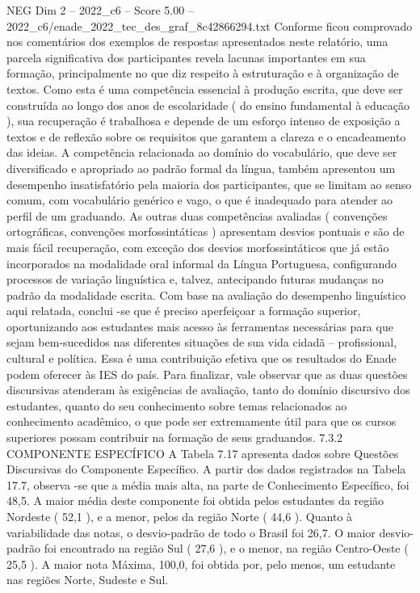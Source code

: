 \begin{textsample}{NEG Dim 2 – 2022\_c6 – Score 5.00 – 2022\_c6/enade\_2022\_tec\_des\_graf\_8c42866294.txt}
Conforme ficou comprovado nos comentários dos exemplos de respostas apresentados neste relatório, uma parcela significativa dos participantes revela lacunas importantes em sua formação, principalmente no que diz respeito à estruturação e à organização de textos.
Como esta é uma competência essencial à produção escrita, que deve ser construída ao longo dos anos de escolaridade ( do ensino fundamental à educação ), sua recuperação é trabalhosa e depende de um esforço intenso de exposição a textos e de reflexão sobre os requisitos que garantem a clareza e o encadeamento das ideias.
A competência relacionada ao domínio do vocabulário, que deve ser diversificado e apropriado ao padrão formal da língua, também apresentou um desempenho insatisfatório pela maioria dos participantes, que se limitam ao senso comum, com vocabulário genérico e vago, o que é inadequado para atender ao perfil de um graduando.
As outras duas competências avaliadas ( convenções ortográficas, convenções morfossintáticas ) apresentam desvios pontuais e são de mais fácil recuperação, com exceção dos desvios morfossintáticos que já estão incorporados na modalidade oral informal da Língua Portuguesa, configurando processos de variação linguística e, talvez, antecipando futuras mudanças no padrão da modalidade escrita.
Com base na avaliação do desempenho linguístico aqui relatada, conclui -se que é preciso aperfeiçoar a formação superior, oportunizando aos estudantes mais acesso às ferramentas necessárias para que sejam bem-sucedidos nas diferentes situações de sua vida cidadã – profissional, cultural e política.
Essa é uma contribuição efetiva que os resultados do Enade podem oferecer às IES do país.
Para finalizar, vale observar que as duas questões discursivas atenderam às exigências de avaliação, tanto do domínio discursivo dos estudantes, quanto do seu conhecimento sobre temas relacionados ao conhecimento acadêmico, o que pode ser extremamente útil para que os cursos superiores possam contribuir na formação de seus graduandos. 7.3.2 COMPONENTE ESPECÍFICO A Tabela 7.17 apresenta dados sobre Questões Discursivas do Componente Específico.
A partir dos dados registrados na Tabela 17.7, observa -se que a média mais alta, na parte de Conhecimento Específico, foi 48,5.
A maior média deste componente foi obtida pelos estudantes da região Nordeste ( 52,1 ), e a menor, pelos da região Norte ( 44,6 ).
Quanto à variabilidade das notas, o desvio-padrão de todo o Brasil foi 26,7.
O maior desvio-padrão foi encontrado na região Sul ( 27,6 ), e o menor, na região Centro-Oeste ( 25,5 ).
A maior nota Máxima, 100,0, foi obtida por, pelo menos, um estudante nas regiões Norte, Sudeste e Sul.

\end{textsample}

